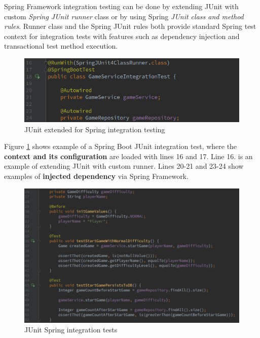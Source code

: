     Spring Framework integration testing can be done by extending JUnit with custom \textit{Spring JUnit runner} class or by using Spring \textit{JUnit class and
    method rules}. Runner class and the Spring JUnit rules both provide standard Spring test context
    for integration tests with features such as dependency injection and transactional test method execution. ~\cite{springintegration}

    \begin{figure}[ht]
      \begin{center}
        \includegraphics[width=12.5cm]{images/junit-init.png}
        \caption{JUnit extended for Spring integration testing}
        \label{fig:springrunner}
      \end{center}
    \end{figure}

    Figure \ref{fig:springrunner} shows example of a Spring Boot JUnit integration test, where the \textbf{context and its configuration} are
    loaded with lines 16 and 17. Line 16. is an example of extending JUnit with custom runner. Lines 20-21 and 23-24 show
    examples of \textbf{injected dependency} via Spring Framework.

    \begin{figure}[ht]
      \begin{center}
        \includegraphics[width=13.7cm]{images/junit-integration.png}
        \caption{JUnit Spring integration tests}
        \label{fig:junit-examples}
      \end{center}
    \end{figure}

